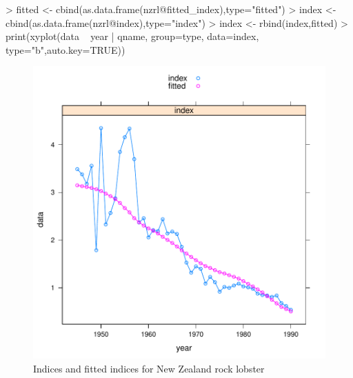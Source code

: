 \documentclass[a4paper]{article}
\begin{document}
\begin{center}
\begin{minipage}[H]{0.95\textwidth}%
\begin{shaded}%
\begin{Schunk}
\begin{Sinput}
> fitted <- cbind(as.data.frame(nzrl@fitted_index),type="fitted")
> index <- cbind(as.data.frame(nzrl@index),type="index")
> index <- rbind(index,fitted)
> print(xyplot(data ~ year | qname, group=type, data=index, type="b",auto.key=TRUE))
\end{Sinput}
\end{Schunk}
\end{shaded}%
\end{minipage}
\end{center}

\begin{figure}
\begin{center}
\includegraphics{flsp_man-nzrlfittedindexplot}
\end{center}
\caption{Indices and fitted indices for New Zealand rock lobster}
\label{fig:fitted_index_nzrl}
\end{figure}
\end{document}
